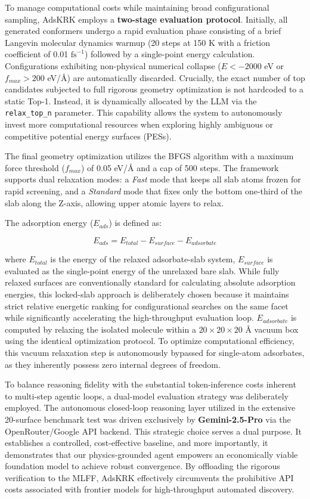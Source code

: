 \documentclass{article}
\begin{document}
To manage computational costs while maintaining broad configurational sampling, AdsKRK employs a \textbf{two-stage evaluation protocol}. Initially, all generated conformers undergo a rapid evaluation phase consisting of a brief Langevin molecular dynamics warmup (20 steps at 150 K with a friction coefficient of 0.01 $\text{fs}^{-1}$) followed by a single-point energy calculation. Configurations exhibiting non-physical numerical collapse ($E < -2000$ eV or $f_{max} > 200$ eV/\AA{}) are automatically discarded. Crucially, the exact number of top candidates subjected to full rigorous geometry optimization is not hardcoded to a static Top-1. Instead, it is dynamically allocated by the LLM via the \texttt{relax\_top\_n} parameter. This capability allows the system to autonomously invest more computational resources when exploring highly ambiguous or competitive potential energy surfaces (PESs).

The final geometry optimization utilizes the BFGS algorithm with a maximum force threshold ($f_{max}$) of 0.05 eV/\AA{} and a cap of 500 steps. The framework supports dual relaxation modes: a \textit{Fast} mode that keeps all slab atoms frozen for rapid screening, and a \textit{Standard} mode that fixes only the bottom one-third of the slab along the Z-axis, allowing upper atomic layers to relax.

The adsorption energy ($E_{ads}$) is defined as:

\begin{equation}E_{ads} = E_{total} - E_{surface} - E_{adsorbate}
\end{equation}

where $E_{total}$ is the energy of the relaxed adsorbate-slab system, $E_{surface}$ is evaluated as the single-point energy of the unrelaxed bare slab. While fully relaxed surfaces are conventionally standard for calculating absolute adsorption energies, this locked-slab approach is deliberately chosen because it maintains strict relative energetic ranking for configurational searches on the same facet while significantly accelerating the high-throughput evaluation loop. $E_{adsorbate}$ is computed by relaxing the isolated molecule within a $20 \times 20 \times 20$ \AA{} vacuum box using the identical optimization protocol. To optimize computational efficiency, this vacuum relaxation step is autonomously bypassed for single-atom adsorbates, as they inherently possess zero internal degrees of freedom.

To balance reasoning fidelity with the substantial token-inference costs inherent to multi-step agentic loops, a dual-model evaluation strategy was deliberately employed. The autonomous closed-loop reasoning layer utilized in the extensive 20-surface benchmark test was driven exclusively by \textbf{Gemini-2.5-Pro} via the OpenRouter/Google API backend. This strategic choice serves a dual purpose. It establishes a controlled, cost-effective baseline, and more importantly, it demonstrates that our physics-grounded agent empowers an economically viable foundation model to achieve robust convergence. By offloading the rigorous verification to the MLFF, AdsKRK effectively circumvents the prohibitive API costs associated with frontier models for high-throughput automated discovery. 
\end{document}

